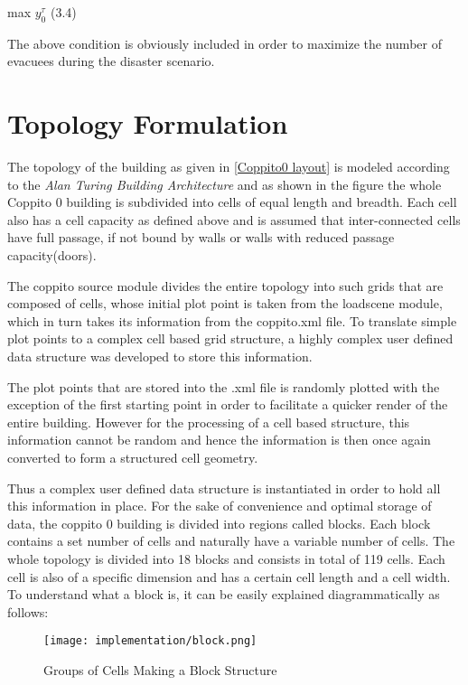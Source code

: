 \hspace{60mm} max $y^\tau_0$    \hspace{60mm} (3.4)

The above condition is obviously included in order to maximize the number of evacuees during the disaster scenario.


\section{Topology Formulation}
\label{sec: Topology Formulation}


The topology of the building as given in \ref{Coppito0 layout} is modeled according to the \textit{Alan Turing Building Architecture} and as shown in the figure the whole Coppito 0 building is subdivided into cells of equal length and breadth. Each cell also has a cell capacity as defined above and is assumed that inter-connected cells have full passage, if not bound by walls or walls with reduced passage capacity(doors). 

The coppito source module divides the entire topology into such grids that are composed of cells, whose initial plot point is taken from the loadscene module, which in turn takes its information from the coppito.xml file. To translate simple plot points to a complex cell based grid structure, a highly complex user defined data structure was developed to store this information. 

The plot points that are stored into the .xml file is randomly plotted with the exception of the first starting point in order to facilitate a quicker render of the entire building. However for the processing of a cell based structure, this information cannot be random and hence the information is then once again converted to form a structured cell geometry.

Thus a complex user defined data structure is instantiated in order to hold all this information in place. For the sake of convenience and optimal storage of data, the coppito 0 building is divided into regions called blocks. Each block contains a set number of cells and naturally have a variable number of cells. The whole topology is divided into 18 blocks and consists in total of 119 cells. Each cell is also of a specific dimension and has a certain cell length and a cell width. To understand what a block is, it can be easily explained diagrammatically as follows:

\begin{figure}[H]
  \centering
  \texttt{[image: implementation/block.png]}
  \caption{Groups of Cells Making a Block Structure}
  \label{block}
\end{figure}


